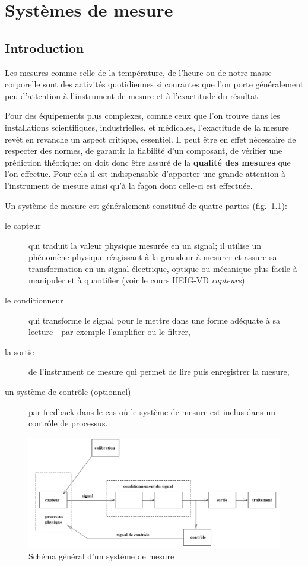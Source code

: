\chapter{Systèmes de mesure}

\section{Introduction}

Les mesures comme celle de la température, de l'heure ou de notre masse corporelle sont des activités quotidiennes si courantes que l'on porte généralement peu d'attention à l'instrument de mesure et à l'exactitude du résultat.

Pour des équipements plus complexes, comme ceux que l'on trouve dans les installations scientifiques, industrielles, et médicales, l'exactitude de la mesure revêt en revanche un aspect critique, essentiel. Il peut être en effet nécessaire de respecter des normes, de garantir la fiabilité d'un composant, de vérifier une prédiction théorique: on doit donc être assuré de la \textbf{qualité des mesures} que l'on effectue. Pour cela il est indispensable d'apporter une grande attention à l'instrument de mesure ainsi qu'à la façon dont celle-ci est effectuée.

Un système de mesure est généralement constitué de quatre parties (fig.~\ref{fig:sysmes}):
\begin{description}
    \item[le capteur] qui traduit la valeur physique mesurée en un signal; il utilise un phénomène physique réagissant à la grandeur à mesurer et assure sa transformation en un signal électrique, optique ou mécanique plus facile à manipuler et à quantifier (voir le cours HEIG-VD \textit{capteurs}).
    \item[le conditionneur] qui transforme le signal pour le mettre dans une forme adéquate à sa lecture - par exemple l'amplifier ou le filtrer,
    \item[la sortie] de l'instrument de mesure qui permet de lire puis enregistrer la mesure,
    \item[un système de contrôle (optionnel)] par feedback dans le cas où le système de mesure est inclus dans un contrôle de processus.
\end{description}
\begin{figure}
    \centering
    \includegraphics[width=20cm]{assets/figures/systemeMesure.pdf}
    \caption{Schéma général d'un système de mesure}
    \label{fig:sysmes}
\end{figure}

